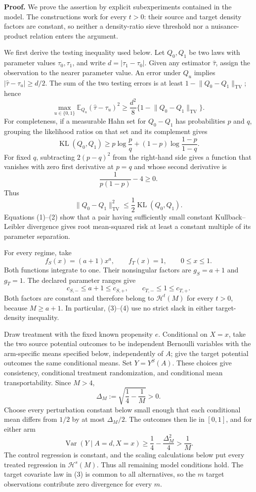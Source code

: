 \textbf{Proof.}
We prove the assertion by explicit subexperiments contained in the model. The constructions work for every \(t>0\): their source and target density factors are constant, so neither a density-ratio sieve threshold nor a nuisance-product relation enters the argument.

We first derive the testing inequality used below. Let \(Q_0,Q_1\) be two laws with parameter values \(\tau_0,\tau_1\), and write \(d=|\tau_1-\tau_0|\). Given any estimator \(\widehat\tau\), assign the observation to the nearer parameter value. An error under \(Q_u\) implies \(|\widehat\tau-\tau_u|\ge d/2\). The sum of the two testing errors is at least \(1-\lVert Q_0-Q_1\rVert_{\mathrm{TV}}\); hence
\[
 \max_{u\in\{0,1\}}\mathbb E_{Q_u}
       (\widehat\tau-\tau_u)^2
 \ge \frac{d^2}{8}
       \{1-\lVert Q_0-Q_1\rVert_{\mathrm{TV}}\}.
\tag{1}
\]
For completeness, if a measurable Hahn set for \(Q_0-Q_1\) has probabilities \(p\) and \(q\), grouping the likelihood ratios on that set and its complement gives
\[
 \operatorname{KL}(Q_0,Q_1)\ge
 p\log\frac pq+(1-p)\log\frac{1-p}{1-q}.
\]
For fixed \(q\), subtracting \(2(p-q)^2\) from the right-hand side gives a function that vanishes with zero first derivative at \(p=q\) and whose second derivative is
\[
 \frac1{p(1-p)}-4\ge0.
\]
Thus
\[
 \lVert Q_0-Q_1\rVert_{\mathrm{TV}}^2
 \le\frac12\operatorname{KL}(Q_0,Q_1).
\tag{2}
\]
Equations (1)--(2) show that a pair having sufficiently small constant Kullback--Leibler divergence gives root mean-squared risk at least a constant multiple of its parameter separation.

For every regime, take
\[
 f_S(x)=(a+1)x^a,
 \qquad f_T(x)=1,
 \qquad 0\le x\le1.
\tag{3}
\]
Both functions integrate to one. Their nonsingular factors are \(g_S=a+1\) and \(g_T=1\). The declared parameter ranges give
\[
 c_{S,-}\le a+1\le c_{S,+},
 \qquad
 c_{T,-}\le1\le c_{T,+}.
\tag{4}
\]
Both factors are constant and therefore belong to \(\mathcal H^t(M)\) for every \(t>0\), because \(M\ge a+1\). In particular, (3)--(4) use no strict slack in either target-density inequality.

Draw treatment with the fixed known propensity \(e\). Conditional on \(X=x\), take the two source potential outcomes to be independent Bernoulli variables with the arm-specific means specified below, independently of \(A\); give the target potential outcomes the same conditional means. Set \(Y=Y^S(A)\). These choices give consistency, conditional treatment randomization, and conditional mean transportability. Since \(M>4\),
\[
 \Delta_M:=\sqrt{\frac14-\frac1M}>0.
\]
Choose every perturbation constant below small enough that each conditional mean differs from \(1/2\) by at most \(\Delta_M/2\). The outcomes then lie in \([0,1]\), and for either arm
\[
 \operatorname{Var}(Y\mid A=d,X=x)
 \ge \frac14-\frac{\Delta_M^2}{4}
 >\frac1M.
\tag{5}
\]
The control regression is constant, and the scaling calculations below put every treated regression in \(\mathcal H^s(M)\). Thus all remaining model conditions hold. The target covariate law in (3) is common to all alternatives, so the \(m\) target observations contribute zero divergence for every \(m\).

